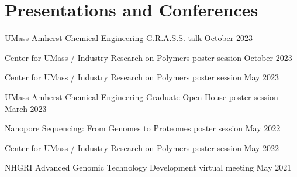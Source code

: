\newcommand{\playsymbol}{$\blacktriangleright$}
\section{\sc Presentations and Conferences}
\begin{etaremune}
	\item
	UMass Amherst Chemical Engineering G.R.A.S.S. talk
	\hfill{}
	October 2023
	\item
	Center for UMass / Industry Research on Polymers poster session
	\hfill{}
	October 2023
	\item
	Center for UMass / Industry Research on Polymers poster session
	\hfill{}
	May 2023
	\item
	UMass Amherst Chemical Engineering Graduate Open House poster session
	\hfill{}
	March 2023
	\item
	Nanopore Sequencing: From Genomes to Proteomes poster session
	\hfill{}
	May 2022
	\item
	Center for UMass / Industry Research on Polymers poster session
	\hfill{}
	May 2022
	\item
	NHGRI Advanced Genomic Technology Development virtual meeting
	\hfill{}
	May 2021
\end{etaremune}


